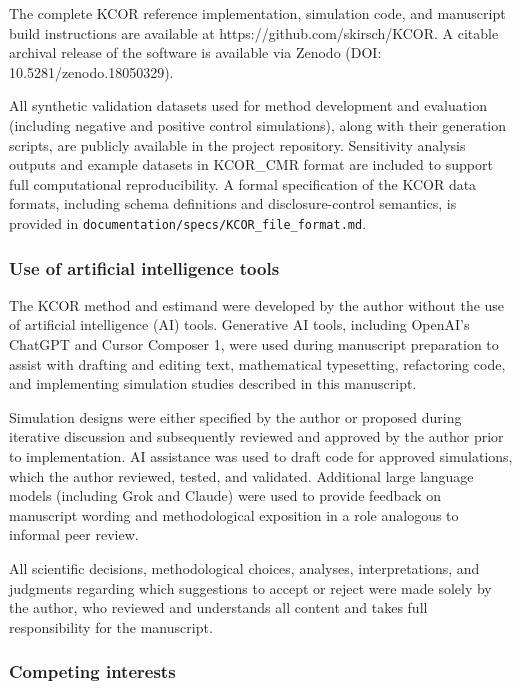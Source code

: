 \documentclass[
]{article}
\begin{document}
The complete KCOR reference implementation, simulation code, and
manuscript build instructions are available at
https://github.com/skirsch/KCOR. A citable archival release of the
software is available via Zenodo (DOI: 10.5281/zenodo.18050329).

All synthetic validation datasets used for method development and
evaluation (including negative and positive control simulations), along
with their generation scripts, are publicly available in the project
repository. Sensitivity analysis outputs and example datasets in
KCOR\_CMR format are included to support full computational
reproducibility. A formal specification of the KCOR data formats,
including schema definitions and disclosure-control semantics, is
provided in \texttt{documentation/specs/KCOR\_file\_format.md}.

\subsubsection{Use of artificial intelligence
tools}\label{use-of-artificial-intelligence-tools}

The KCOR method and estimand were developed by the author without the
use of artificial intelligence (AI) tools. Generative AI tools,
including OpenAI's ChatGPT and Cursor Composer 1, were used during
manuscript preparation to assist with drafting and editing text,
mathematical typesetting, refactoring code, and implementing simulation
studies described in this manuscript.

Simulation designs were either specified by the author or proposed
during iterative discussion and subsequently reviewed and approved by
the author prior to implementation. AI assistance was used to draft code
for approved simulations, which the author reviewed, tested, and
validated. Additional large language models (including Grok and Claude)
were used to provide feedback on manuscript wording and methodological
exposition in a role analogous to informal peer review.

All scientific decisions, methodological choices, analyses,
interpretations, and judgments regarding which suggestions to accept or
reject were made solely by the author, who reviewed and understands all
content and takes full responsibility for the manuscript.

\subsubsection{Competing interests}\label{competing-interests}
\end{document}
